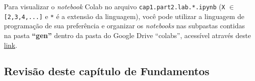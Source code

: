 \documentclass[12pt,a4paper]{article}
\begin{document}
    Para visualizar o \emph{notebook} Colab no arquivo
\texttt{cap1.part2.lab.*.ipynb} (\texttt{X} \(\in\)
\texttt{{[}2,3,4,...{]}} e \texttt{*} é a extensão da linguagem), você
pode utilizar a linguagem de programação de sua preferência e organizar
os \emph{notebooks} nas subpastas contidas na pasta \textbf{``gen''}
dentro da pasta do Google Drive ``colabs'', acessível através deste
\href{https://drive.google.com/drive/folders/1YlFwv8XYN7PYYf-HwDMlkxzbmXzJw9cM?usp=sharing}{link}.

    \hypertarget{revisuxe3o-deste-capuxedtulo-de-fundamentos}{%
\subsection{Revisão deste capítulo de
Fundamentos}\label{revisuxe3o-deste-capuxedtulo-de-fundamentos}}
\end{document}

